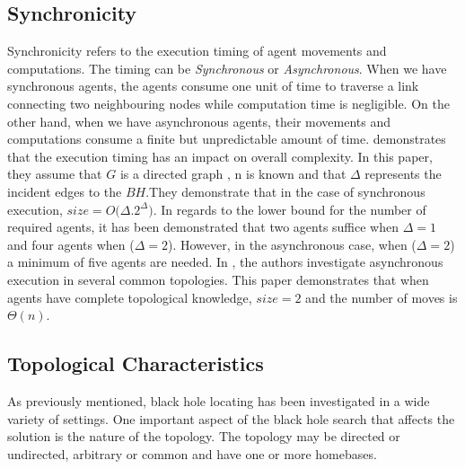 \subsection{Synchronicity}
Synchronicity refers to the execution timing of agent movements and computations. The timing can be {\it Synchronous} or {\it Asynchronous}. When we have synchronous agents, the agents consume one unit of time to traverse a link connecting two neighbouring nodes while computation time is negligible. On the other hand, when we have asynchronous agents, their movements and computations consume a finite but unpredictable amount of time.  \cite{kosetal15} demonstrates that the execution timing has an impact on overall complexity. In this paper, they assume that $G$ is a directed graph , n is known and that $\Delta$ represents the incident edges to the $BH$.They demonstrate that in the case of synchronous execution, $size=O(\Delta$.$ 2^{\Delta})$. In regards to the lower bound for the number of required agents, it has been demonstrated that two agents suffice when $\Delta=1$ and four agents when ($\Delta=2$). However, in the asynchronous case, when ($\Delta=2$) a minimum of five agents are needed.
In \cite{dobetal3}, the authors investigate asynchronous execution in several common topologies. This paper demonstrates that when agents have complete topological knowledge, $size=2$ and the number of moves is $\Theta (n)$.

\subsection{Topological Characteristics}
As previously mentioned, black hole locating has been investigated in a wide variety of settings. One important aspect of the black hole search that affects the solution is the nature of the topology. The topology may be directed or undirected, arbitrary or common and have one or more homebases.

